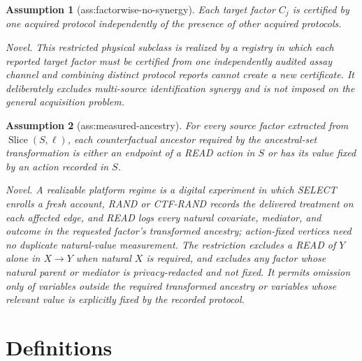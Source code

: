 \documentclass{article}
\newtheorem{assumption}{Assumption}
\begin{document}
\begin{assumption}[ass:factorwise-no-synergy]\label{ass:factorwise-no-synergy}
Each target factor \(C_j\) is certified by one acquired protocol independently of the presence of other acquired protocols.
\par\smallskip\noindent\emph{Novel.} This restricted physical subclass is realized by a registry in which each reported target factor must be certified from one independently audited assay channel and combining distinct protocol reports cannot create a new certificate. It deliberately excludes multi-source identification synergy and is not imposed on the general acquisition problem.
\end{assumption}

\begin{assumption}[ass:measured-ancestry]\label{ass:measured-ancestry}
For every source factor extracted from \(\operatorname{Slice}(S,\ell)\), each counterfactual ancestor required by the ancestral-set transformation is either an endpoint of a READ action in \(S\) or has its value fixed by an action recorded in \(S\).
\par\smallskip\noindent\emph{Novel.} A realizable platform regime is a digital experiment in which SELECT enrolls a fresh account, RAND or CTF-RAND records the delivered treatment on each affected edge, and READ logs every natural covariate, mediator, and outcome in the requested factor's transformed ancestry; action-fixed vertices need no duplicate natural-value measurement. The restriction excludes a READ of \(Y\) alone in \(X\to Y\) when natural \(X\) is required, and excludes any factor whose natural parent or mediator is privacy-redacted and not fixed. It permits omission only of variables outside the required transformed ancestry or variables whose relevant value is explicitly fixed by the recorded protocol.
\end{assumption}

\section{Definitions}
\end{document}
